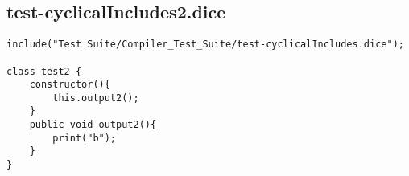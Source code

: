 \subsection{test-cyclicalIncludes2.dice}
\begin{verbatim}
include("Test Suite/Compiler_Test_Suite/test-cyclicalIncludes.dice");

class test2 {
	constructor(){
		this.output2();
	}
	public void output2(){
		print("b");
	}
}

\end{verbatim}